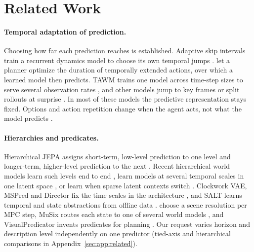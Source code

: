 \section{Related Work}
\label{sec:rel}

\begin{revblock}\nopagebreak
\paragraph{Temporal adaptation of prediction.}
Choosing how far each prediction reaches is established. Adaptive skip intervals train a recurrent dynamics model to choose its own temporal jumps \citep{neitz2018adaptive}. \citet{chatterjee2025improving} let a planner optimize the duration of temporally extended actions, over which a learned model then predicts. TAWM trains one model across time-step sizes to serve several observation rates \citep{nhu2025tawm}, and other models jump to key frames \citep{jayaraman2019tap,pertsch2020keyin,kim2019vta} or split rollouts at surprise \citep{iiyama2026sunta}. In most of these models the predictive representation stays fixed. Options and action repetition change when the agent acts, not what the model predicts \citep{sutton1999options,biedenkapp2021temporl}.

\paragraph{Hierarchies and predicates.}
Hierarchical JEPA assigns short-term, low-level prediction to one level and longer-term, higher-level prediction to the next \citep[\S4.4, \S4.6]{lecun2022path}. Recent hierarchical world models learn such levels end to end \citep{zhang2026hjepa}, learn models at several temporal scales in one latent space \citep{zhang2026hierarchical}, or learn when sparse latent contexts switch \citep{gumbsch2024thick}. Clockwork VAE, MSPred and Director fix the time scales in the architecture \citep{saxena2021clockwork,villarcorrales2022mspred,hafner2022director}, and SALT learns temporal and state abstractions from offline data \citep{huang2026salt}. \citet{wang2023dynamic} choose a scene resolution per MPC step, MuSix routes each state to one of several world models \citep{jang2026musix}, and VisualPredicator invents predicates for planning \citep{liang2025visualpredicator}. Our request varies horizon and description level independently on one predictor (tied-axis and hierarchical comparisons in Appendix~\ref{sec:app:related}).


\end{revblock}
